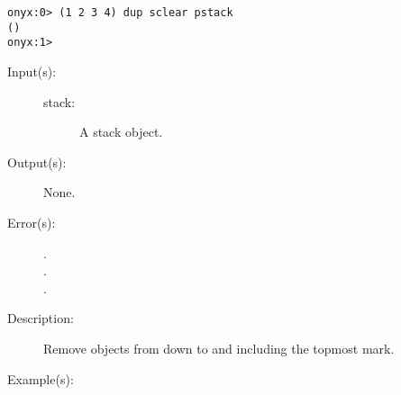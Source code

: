 \begin{description}
\begin{description}
\begin{verbatim}
onyx:0> (1 2 3 4) dup sclear pstack
()
onyx:1>
		\end{verbatim}
	\end{description}
\label{systemdict:scleartomark}
\item[{\onyxop{stack}{scleartomark}{--}}: ]
	\begin{description}\item[]
	\item[Input(s): ]
		\begin{description}\item[]
		\item[stack: ]
			A stack object.
		\end{description}
	\item[Output(s): ] None.
	\item[Error(s): ]
		\begin{description}\item[]
		\item[.]
		\item[.]
		\item[.]
		\end{description}
	\item[Description: ]
		Remove objects from  down to and including the
		topmost mark.
	\item[Example(s): ]\begin{verbatim}


\end{verbatim}
\end{description}
\end{description}
